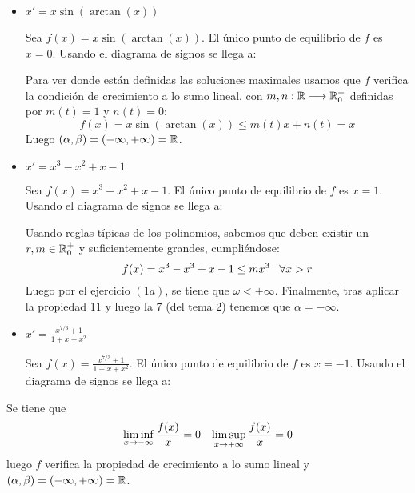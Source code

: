 \documentclass[12pt]{article}
\theoremstyle{definition}
\theoremstyle{remark}
\newcommand*{\TickSize}{2pt}%
\newcommand*{\AxisMin}{0}%
\newcommand*{\AxisMax}{0}%
\newcommand*{\DrawHorizontalPhaseLine}[4][]{%
    \gdef\AxisMin{0}%
    \gdef\AxisMax{0}%
    \edef\MyList{#2}%
    \foreach \X in \MyList {
        \draw  (\X,\TickSize) -- (\X,-\TickSize) node [below] {$\X$};
        \ifnum\AxisMin>\X
            \xdef\AxisMin{\X}%
        \fi
        \ifnum\AxisMax<\X
            \xdef\AxisMax{\X}%
        \fi
    }

    \edef\MyList{#3}%
    \foreach \X in \MyList {%
        \draw [->] (\X-0.1,0) -- (\X,0);
        \ifnum\AxisMin>\X
            \xdef\AxisMin{\X}%
        \fi
        \ifnum\AxisMax<\X
            \xdef\AxisMax{\X}%
        \fi
    }

    \edef\MyList{#4}%
    \foreach \X in \MyList {%
        \draw [<-] (\X-0.1,0) -- (\X,0);
        \ifnum\AxisMin>\X
            \xdef\AxisMin{\X}%
        \fi
        \ifnum\AxisMax<\X
            \xdef\AxisMax{\X}%
        \fi
    }

    \draw  (\AxisMin-1,0) -- (\AxisMax+1,0) node [right] {#1};
}%
\begin{document}
\begin{itemize}
\item $x'=x\sin(\arctan(x))$

Sea $f(x)=x\sin(\arctan(x))$. El único punto de equilibrio de $f$ es $x=0$. Usando el diagrama de signos se llega a:
\begin{center}
\end{center}

Para ver donde están definidas las soluciones maximales usamos que $f$ verifica la condición de crecimiento a lo sumo lineal, con $m,n : \mathbb{R} \longrightarrow \mathbb{R}^+_0$ definidas por $m(t)=1$ y $n(t)=0$:
\[
f(x)=x\sin(\arctan(x))\leq m(t)x+n(t) = x
\]
Luego $(\alpha,\beta)=(-\infty,+\infty)=\mathbb{R}$.

\item $x'=x^3-x^2+x-1$

Sea $f(x)=x^3-x^2+x-1$. El único punto de equilibrio de $f$ es $x=1$. Usando el diagrama de signos se llega a:
\begin{center}
\end{center}

Usando reglas típicas de los polinomios, sabemos que deben existir un $r,m\in\mathbb{R}^+_0$ y suficientemente grandes, cumpliéndose:
\[
f(x)=x^3-x^3+x-1\leq mx^3 \;\;\; \forall x > r
\]
Luego por el ejercicio  $(1a)$, se tiene que $\omega<+\infty$. Finalmente, tras aplicar la propiedad 11 y luego la 7 (del tema 2) tenemos que $\alpha=-\infty$.

\item $x'=\frac{x^{7/3}+1}{1+x+x^2}$

Sea $f(x)=\frac{x^{7/3}+1}{1+x+x^2}$. El único punto de equilibrio de $f$ es $x=-1$. Usando el diagrama de signos se llega a:
\begin{center}
\end{center}
\end{itemize}
Se tiene que
\[
\liminf_{x\to-\infty}\frac{f(x)}{x}=0 \;\;\; \limsup_{x\to+\infty}\frac{f(x)}{x}=0
\]
luego $f$ verifica la propiedad de crecimiento a lo sumo lineal y $(\alpha,\beta)=(-\infty,+\infty)=\mathbb{R}$.
\end{document}
